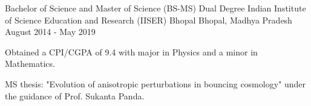 \begin{cventries}
{
\cventry
{Bachelor of Science and Master of Science (BS-MS) Dual Degree} %
{Indian Institute of Science Education and Research (IISER) Bhopal } %
{ Bhopal, Madhya Pradesh} %
{ August 2014 - May 2019} %
{ %
\begin{cvitems}
\item Obtained a CPI/CGPA of 9.4 with major in Physics and a minor in Mathematics.
\item MS thesis: "Evolution of anisotropic perturbations in bouncing cosmology" under the guidance of Prof. Sukanta Panda.
\end{cvitems}
}
}





\end{cventries}
